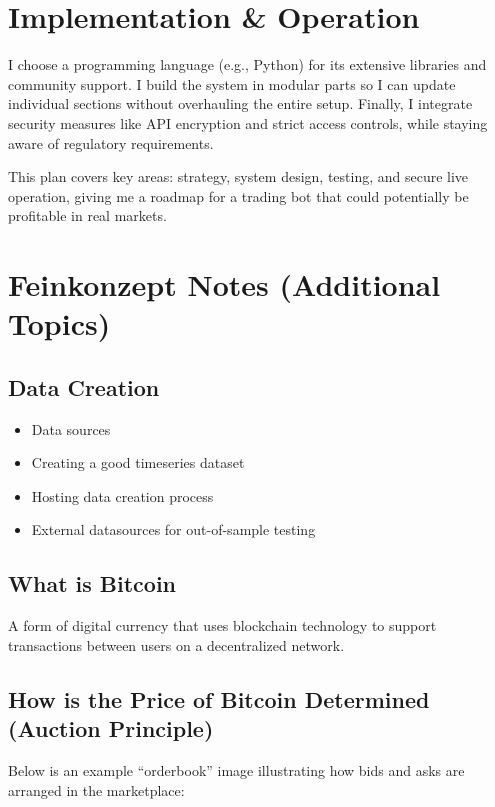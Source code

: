 \documentclass[9pt,a4paper,twocolumn,twoside]{tau-class/tau}
\begin{document}
\section{Implementation \& Operation}

I choose a programming language (e.g., Python) for its extensive libraries 
and community support. I build the system in modular parts so I can update 
individual sections without overhauling the entire setup. Finally, I 
integrate security measures like API encryption and strict access 
controls, while staying aware of regulatory requirements.

\noindent
This plan covers key areas: strategy, system design, testing, and secure 
live operation, giving me a roadmap for a trading bot that could potentially 
be profitable in real markets.

\section{Feinkonzept Notes (Additional Topics)}

\subsection{Data Creation}
\begin{itemize}
  \item Data sources
  \item Creating a good timeseries dataset
  \item Hosting data creation process
  \item External datasources for out-of-sample testing
\end{itemize}

\subsection{What is Bitcoin}
A form of digital currency that uses blockchain technology to support transactions between users on a decentralized network.

\subsection{How is the Price of Bitcoin Determined (Auction Principle)}

Below is an example “orderbook” image illustrating how bids and asks are 
arranged in the marketplace:
\end{document}
